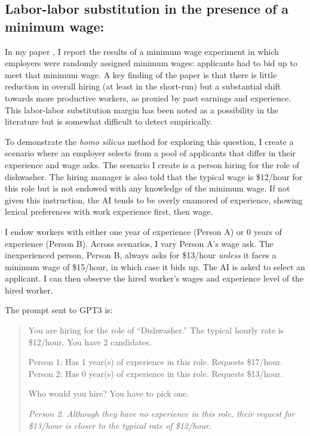 \documentclass[11pt]{article}
\begin{document}
\subsection{Labor-labor substitution in the presence of a minimum wage: \cite{horton2023}}
In my paper \cite{horton2023}, I report the results of a minimum wage experiment in which employers were randomly assigned minimum wages: applicants had to bid up to meet that minimum wage.
A key finding of the paper is that there is little reduction in overall hiring (at least in the short-run) but a substantial shift towards more productive workers, as proxied by past earnings and experience. 
This labor-labor substitution margin has been noted as a possibility in the literature but is somewhat difficult to detect empirically.

To demonstrate the \emph{homo silicus} method for exploring this question, I create a scenario where an employer selects from a pool of applicants that differ in their experience and wage asks.  
The scenario I create is a person hiring for the role of dishwasher.
The hiring manager is also told that the typical wage is \$12/hour for this role but is not endowed with any knowledge of the minimum wage. 
If not given this instruction, the AI tends to be overly enamored of experience, showing lexical preferences with work experience first, then wage. 

I endow workers with either one year of experience (Person A) or 0 years of experience (Person B).
Across scenarios, I vary Person A's wage ask. 
The inexperienced person, Person B, always asks for \$13/hour \emph{unless} it faces a minimum wage of \$15/hour, in which case it bids up.
The AI is asked to select an applicant. 
I can then observe the hired worker's wages and experience level of the hired worker.

The prompt sent to GPT3 is:
\begin{quote}
You are hiring for the role of ``Dishwasher.''
The typical hourly rate is \$12/hour.
You have 2 candidates.

Person 1: Has 1 year(s) of experience in this role. Requests \$17/hour.
Person 2: Has 0 year(s) of experience in this role. Requests \$13/hour.

Who would you hire? You have to pick one.

\textit{Person 2. Although they have no experience in this role, their request for \$13/hour is closer to the typical rate of \$12/hour.}
\end{quote}
\end{document}
